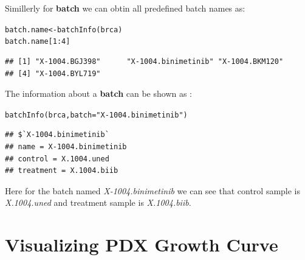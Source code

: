\documentclass{article}\usepackage[]{graphicx}\usepackage[usenames,dvipsnames]{color}
\newcommand{\hlnum}[1]{\textcolor[rgb]{0.816,0.125,0.439}{#1}}%
\newcommand{\hlstr}[1]{\textcolor[rgb]{0.251,0.627,0.251}{#1}}%
\newcommand{\hlopt}[1]{\textcolor[rgb]{0,0,0}{#1}}%
\newcommand{\hlstd}[1]{\textcolor[rgb]{0.251,0.251,0.251}{#1}}%
\newcommand{\hlkwb}[1]{\textcolor[rgb]{0,0,0}{#1}}%
\newcommand{\hlkwc}[1]{\textcolor[rgb]{0.251,0.251,0.251}{#1}}%
\newcommand{\hlkwd}[1]{\textcolor[rgb]{0.878,0.439,0.125}{#1}}%
\newenvironment{knitrout}{}{} %
\begin{document}
Simillerly for \textbf{batch} we can obtin all predefined batch names as:

\begin{knitrout}
\color{fgcolor}\begin{kframe}
\begin{alltt}
\hlstd{batch.name} \hlkwb{<-} \hlkwd{batchInfo}\hlstd{(brca)}
\hlstd{batch.name[}\hlnum{1}\hlopt{:}\hlnum{4}\hlstd{]}
\end{alltt}
\begin{verbatim}
## [1] "X-1004.BGJ398"      "X-1004.binimetinib" "X-1004.BKM120"     
## [4] "X-1004.BYL719"
\end{verbatim}
\end{kframe}
\end{knitrout}

The information about a \textbf{batch} can be shown as :
\begin{knitrout}
\color{fgcolor}\begin{kframe}
\begin{alltt}
\hlkwd{batchInfo}\hlstd{(brca,} \hlkwc{batch} \hlstd{=} \hlstr{"X-1004.binimetinib"}\hlstd{)}
\end{alltt}
\begin{verbatim}
## $`X-1004.binimetinib`
## name = X-1004.binimetinib
## control = X.1004.uned
## treatment = X.1004.biib
\end{verbatim}
\end{kframe}
\end{knitrout}
Here for the batch named \textit{X-1004.binimetinib} we can see that control sample is \textit{X.1004.uned} and treatment sample is \textit{X.1004.biib}.



\section{Visualizing PDX Growth Curve}
\end{document}
